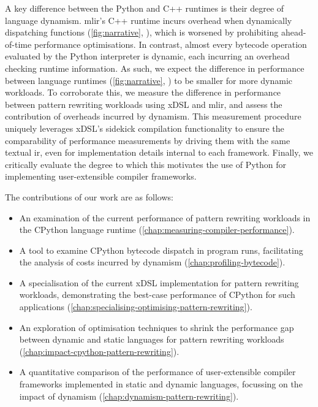 A key difference between the Python and C++ runtimes is their degree of language dynamism.
\ac{mlir}'s C++ runtime incurs overhead when dynamically dispatching functions (\autoref{fig:narrative}, ), which is worsened by prohibiting ahead-of-time performance optimisations. In contrast, almost every bytecode operation evaluated by the Python interpreter is dynamic, each incurring an overhead checking runtime information.
As such, we expect the difference in performance between language runtimes (\autoref{fig:narrative}, ) to be smaller for more dynamic workloads.
To corroborate this, we measure the difference in performance between pattern rewriting workloads using xDSL and \ac{mlir}, and assess the contribution of overheads incurred by dynamism.
This measurement procedure uniquely leverages xDSL's sidekick compilation functionality to ensure the comparability of performance measurements by driving them with the same textual \ac{ir}, even for implementation details internal to each framework.
Finally, we critically evaluate the degree to which this motivates the use of Python for implementing user-extensible compiler frameworks.



The contributions of our work are as follows:

\begin{itemize}
    \item An examination of the current %
    performance of pattern rewriting workloads in the CPython language runtime (\autoref{chap:measuring-compiler-performance}).%
    \item A tool to examine CPython bytecode dispatch in program runs, facilitating the analysis of costs incurred by dynamism (\autoref{chap:profiling-bytecode}).
    \item A specialisation of the current xDSL implementation for pattern rewriting workloads, demonstrating the best-case performance of CPython for such applications (\autoref{chap:specialising-optimising-pattern-rewriting}).
    \item An exploration of optimisation techniques to shrink the performance gap between dynamic and static languages for pattern rewriting workloads (\autoref{chap:impact-cpython-pattern-rewriting}).
    \item A quantitative comparison of the performance of user-extensible compiler frameworks implemented in static and dynamic languages, focussing on the impact of dynamism (\autoref{chap:dynamism-pattern-rewriting}). %
\end{itemize}
